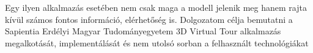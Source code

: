 Egy ilyen alkalmazás esetében nem csak maga a modell jelenik meg hanem rajta kívül számos fontos információ, elérhetőség is. Dolgozatom célja bemutatni a Sapientia Erdélyi Magyar Tudományegyetem 3D Virtual Tour alkalmazás megalkotását, implementálását és nem utolsó sorban a felhasznált technológiákat

